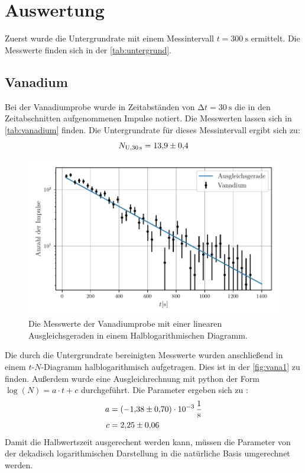\section{Auswertung}
\label{sec:Auswertung}
Zuerst wurde die Untergrundrate mit einem Messintervall $t=\SI{300}{\second}$ ermittelt. 
Die Messwerte finden sich in der \autoref{tab:untergrund}.
\subsection{Vanadium}
Bei der Vanadiumprobe wurde in Zeitabständen von $\increment t = \SI{30}{\second}$ die in den Zeitabschnitten aufgenommenen Impulse notiert. 
Die Messwerten lassen sich in \autoref{tab:vanadium} finden. 
Die Untergrundrate für  dieses Messintervall ergibt sich zu:
\begin{equation*}
  N_{\text{U}, \SI{30}{\second}} = \num{13.9 \pm 0.4}
\end{equation*}
\begin{figure}
  \centering
  \includegraphics{build/vanadium.pdf}
  \caption{Die Messwerte der Vanadiumprobe mit einer linearen Ausgleichsgeraden in einem Halblogarithmischen Diagramm.}
  \label{fig:vana1}
\end{figure}
Die durch die Untergrundrate bereinigten Messwerte wurden anschließend in einem $t$-$N$-Diagramm halblogarithmisch aufgetragen.
Dies ist in der \autoref{fig:vana1} zu finden. 
Außerdem wurde eine Ausgleichrechnung mit python der Form $\log(N) = a\cdot t + c$ durchgeführt.
Die Parameter ergeben sich zu :
\begin{align*}
  a &= \SI{-1.38(70)e-3}{\per\second}\\
  c &= \num{2.25\pm 0.06}
\end{align*}
Damit die Halbwertszeit ausgerechent werden kann, müssen die Parameter von der dekadisch logarithmischen Darstellung in die natürliche Basis umgerechnet werden.
